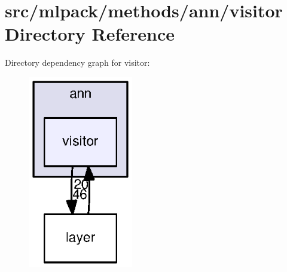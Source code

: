 \section{src/mlpack/methods/ann/visitor Directory Reference}
\label{dir_b555923761b25372c22bbdf14676b4b4}
Directory dependency graph for visitor\+:
\nopagebreak
\begin{figure}[H]
\begin{center}
\leavevmode
\includegraphics[width=130pt]{dir_b555923761b25372c22bbdf14676b4b4_dep}
\end{center}
\end{figure}
